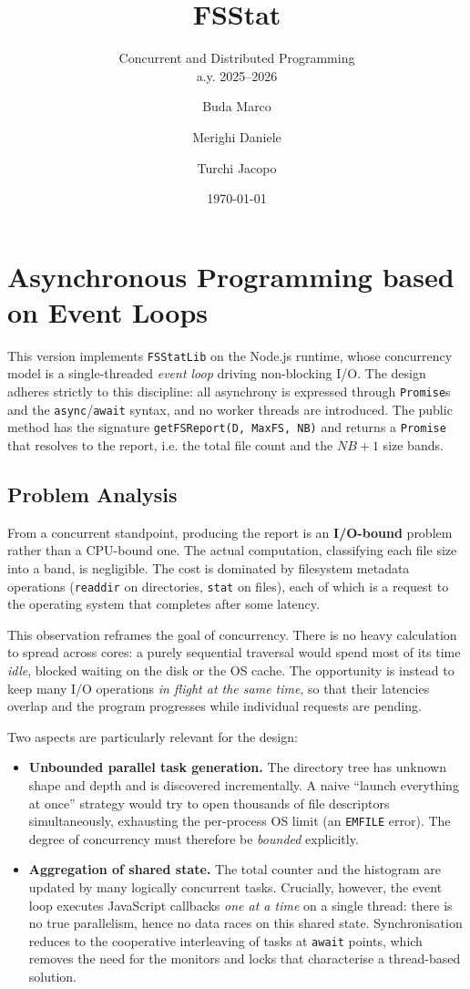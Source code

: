 \documentclass{scrartcl}
\title{\LARGE
  FSStat
}
\subtitle{Concurrent and Distributed Programming\\a.y. 2025--2026}
\author{
    Buda Marco \and Merighi Daniele \and Turchi Jacopo
}
\date{\today}
\begin{document}
\maketitle

\section{Asynchronous Programming based on Event Loops}

This version implements \texttt{FSStatLib} on the Node.js runtime, whose concurrency model is a single-threaded \emph{event loop} driving non-blocking I/O. The design adheres strictly to this discipline: all asynchrony is expressed through \texttt{Promise}s and the \texttt{async}/\texttt{await} syntax, and no worker threads are introduced. The public method has the signature \texttt{getFSReport(D, MaxFS, NB)} and returns a \texttt{Promise} that resolves to the report, i.e. the total file count and the $NB + 1$ size bands.

\subsection{Problem Analysis}

From a concurrent standpoint, producing the report is an \textbf{I/O-bound} problem rather than a CPU-bound one. The actual computation, classifying each file size into a band, is negligible. The cost is dominated by filesystem metadata operations (\texttt{readdir} on directories, \texttt{stat} on files), each of which is a request to the operating system that completes after some latency.

This observation reframes the goal of concurrency. There is no heavy calculation to spread across cores: a purely sequential traversal would spend most of its time \emph{idle}, blocked waiting on the disk or the OS cache. The opportunity is instead to keep many I/O operations \emph{in flight at the same time}, so that their latencies overlap and the program progresses while individual requests are pending.

Two aspects are particularly relevant for the design:

\begin{itemize}
    \item \textbf{Unbounded parallel task generation.} The directory tree has unknown shape and depth and is discovered incrementally. A naive ``launch everything at once'' strategy would try to open thousands of file descriptors simultaneously, exhausting the per-process OS limit (an \texttt{EMFILE} error). The degree of concurrency must therefore be \emph{bounded} explicitly.
    \item \textbf{Aggregation of shared state.} The total counter and the histogram are updated by many logically concurrent tasks. Crucially, however, the event loop executes JavaScript callbacks \emph{one at a time} on a single thread: there is no true parallelism, hence no data races on this shared state. Synchronisation reduces to the cooperative interleaving of tasks at \texttt{await} points, which removes the need for the monitors and locks that characterise a thread-based solution.
\end{itemize}
\end{document}

